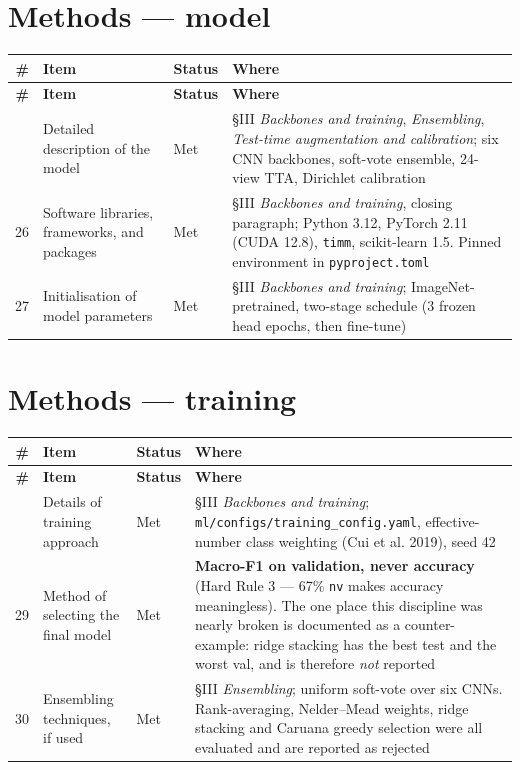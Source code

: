 \documentclass[10pt,a4paper]{article}
\begin{document}
\section*{Methods --- model}


\begin{longtable}{@{}rp{}lp{}@{}}
\toprule
\textbf{\#} & \textbf{Item} & \textbf{Status} & \textbf{Where} \\
\midrule
\endfirsthead
\toprule
\textbf{\#} & \textbf{Item} & \textbf{Status} & \textbf{Where} \\
\midrule
\endhead
\bottomrule
\endfoot
25 & Detailed description of the model & Met & \S{}III \emph{Backbones and training}, \emph{Ensembling}, \emph{Test-time augmentation and calibration}; six CNN backbones, soft-vote ensemble, 24-view TTA, Dirichlet calibration \\
26 & Software libraries, frameworks, and packages & Met & \S{}III \emph{Backbones and training}, closing paragraph; Python 3.12, PyTorch 2.11 (CUDA 12.8), \texttt{timm}, scikit-learn 1.5. Pinned environment in \texttt{pyproject.toml} \\
27 & Initialisation of model parameters & Met & \S{}III \emph{Backbones and training}; ImageNet-pretrained, two-stage schedule (3 frozen head epochs, then fine-tune) \\
\end{longtable}


\section*{Methods --- training}


\begin{longtable}{@{}rp{}lp{}@{}}
\toprule
\textbf{\#} & \textbf{Item} & \textbf{Status} & \textbf{Where} \\
\midrule
\endfirsthead
\toprule
\textbf{\#} & \textbf{Item} & \textbf{Status} & \textbf{Where} \\
\midrule
\endhead
\bottomrule
\endfoot
28 & Details of training approach & Met & \S{}III \emph{Backbones and training}; \texttt{ml/configs/training\_config.yaml}, effective-number class weighting (Cui et al. 2019), seed 42 \\
29 & Method of selecting the final model & Met & \textbf{Macro-F1 on validation, never accuracy} (Hard Rule 3 --- 67\% \texttt{nv} makes accuracy meaningless). The one place this discipline was nearly broken is documented as a counter-example: ridge stacking has the best test and the worst val, and is therefore \emph{not} reported \\
30 & Ensembling techniques, if used & Met & \S{}III \emph{Ensembling}; uniform soft-vote over six CNNs. Rank-averaging, Nelder--Mead weights, ridge stacking and Caruana greedy selection were all evaluated and are reported as rejected \\
\end{longtable}
\end{document}
